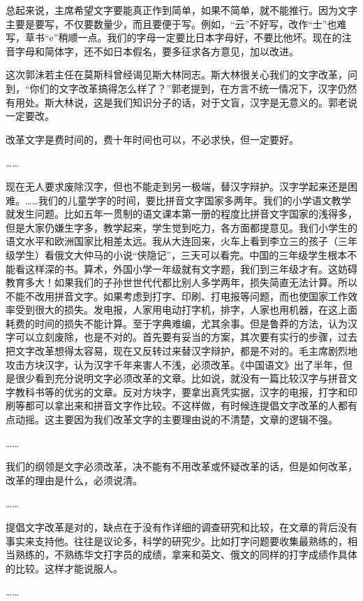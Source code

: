 总起来说，主席希望文字要能真正作到简单，如果不简单，就不能推行。因为文字主要是要写，不仅要数量少，而且要便于写。例如，“云”不好写，改作“士”也难写，草书“e”稍顺一点。我们的字母一定要比日本字母好，不要比他坏。现在的注音字母和简体字，还不如日本假名，要多征求各方意见，加以改进。

这次郭沬若主任在莫斯科曾经谒见斯大林同志。斯大林很关心我们的文字改革，问到，“你们的文字改革搞得怎么样了？”郭老提到，在方言不统一情况下，汉字仍然有用处。斯大林说，这是我们知识分子的话，对于文盲，汉字是无意义的。郭老说一定要改。

改革文字是费时间的，费十年时间也可以，不必求快，但一定要好。

……

现在无人要求废除汉字，但也不能走到另一极端，替汉字辩护。汉字学起来还是困难。……我们的儿童学字的时间，要比拼音文字国家多两年。我们的小学语文教学就发生问题。比如五年一贯制的语文课本第一册的程度比拼音文字国家的浅得多，但是大家仍嫌生字多，教学起来，学生觉到吃力，各方面都提意见。我们小学生的语文水平和欧洲国家比相差太远。我从大连回来，火车上看到李立三的孩子（三年级学生）看俄文大仲马的小说“侠隐记”，三天可以看完。中国的三年级学生根本不能看这样深的书。算术，外国小学一年级就有文字题，我们到三年级才有。这妨碍教育多大！如果我们的子孙世世代代都比别人多学两年，损失简直无法计算。所以不能不改用拼音文字。如果考虑到打字、印刷、打电报等问题，而也使国家工作效率受到很大的损失。发电报，人家用电动打字机，排字，人家也用机器，在这上面耗费的时间的损失不能计算。至于字典难编，尤其余事。但是鲁莽的方法，认为汉字可以立刻废除，也是不对的。首先要有妥当的方案，其次要有实行的步骤，过去把文字改革想得太容易，现在又反转过来替汉字辩护，都是不对的。毛主席剧烈地攻击方块汉字，认为汉字千年来害人不浅，必须改革。《中国语文》出了半年，但是很少看到充分说明文字必须改革的文章。比如说，就没有一篇比较汉字与拼音文字教科书等的优劣的文章。反对方块字，要拿出真凭实据，汉字的电报，打字和印刷等都可以拿出来和拼音文字作比较。不这样做，有时候连提倡文字改革的人都有点动摇。这主要因为我们改革文字的主要理由说的不清楚，文章的逻辑不强。

……

我们的纲领是文字必须改革，决不能有不用改革或怀疑改革的话，但是如何改革，改革的理由是什么，必须说清。

……

提倡文字改革是对的，缺点在于没有作详细的调查研究和比较，在文章的背后没有事实来支持他。往往是议论多，科学的研究少。比如打字问题要收集最熟练的，相当熟练的，不熟练华文打字员的成绩，拿来和英文、俄文的同样的打字成绩作具体的比较。这样才能说服人。

……

